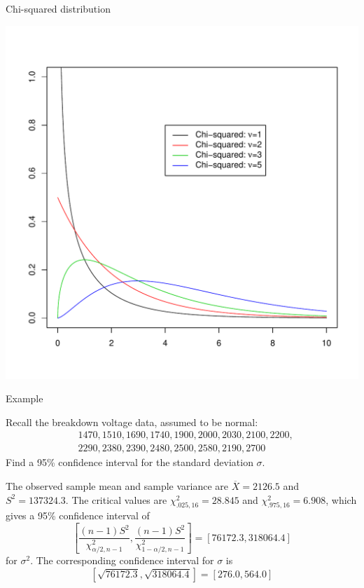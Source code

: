 \documentclass[t,handout]{beamer}
\begin{document}
    \begin{frame}{Chi-squared distribution}
    \vspace{-1cm}
    \begin{center}
    \includegraphics[scale=.5]{chisq.pdf}
    \end{center}
    \end{frame}
    
    \begin{frame}{Example}
    \begin{block}{}
    Recall the breakdown voltage data,  assumed to be normal:
    \begin{align*}
    &1470, 1510, 1690, 1740, 1900, 2000, 2030, 2100, 2200, \\
    & 2290, 2380, 2390, 2480, 2500, 2580, 2190, 2700
    \end{align*}
    Find a 95\% confidence interval for the standard deviation $\sigma$.
    \end{block}
    
    \pause The observed sample mean and sample variance are $\overline X=2126.5$ and $S^2=137324.3$. \pause The critical values are $\chi^2_{.025,16}=28.845$ and $\chi^2_{.975,16}=6.908$, \pause which gives a 95\% confidence interval of
    $$\left[\frac{(n-1)S^2}{\chi^2_{\alpha/2,n-1}}, \frac{(n-1)S^2}{\chi^2_{1-\alpha/2,n-1}}\right]
    = [76172.3, 318064.4]$$
    for $\sigma^2$. \pause The corresponding confidence interval for $\sigma$ is
    $$[\sqrt{76172.3}, \sqrt{318064.4}] = [276.0, 564.0]$$
    
    \end{frame}
    
\end{document}
